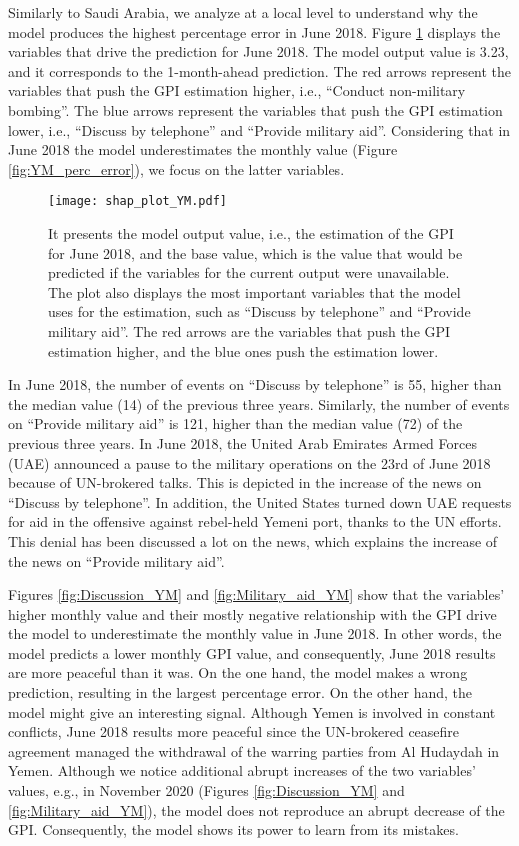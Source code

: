 \documentclass{bmcart}
\begin{document}
Similarly to Saudi Arabia, we analyze at a local level to understand why the model produces the highest percentage error in June 2018. 
Figure \ref{fig:individual_plot_YM} displays the variables that drive the prediction for June 2018. 
The model output value is 3.23, and it corresponds to the 1-month-ahead prediction. 
The red arrows represent the variables that push the GPI estimation higher, i.e., ``Conduct non-military bombing''. 
The blue arrows represent the variables that push the GPI estimation lower, i.e., ``Discuss by telephone'' and ``Provide military aid''. Considering that in June 2018 the model underestimates the monthly value (Figure \ref{fig:YM_perc_error}), we focus on the latter variables. 
\begin{figure}[h!]
\centering
\texttt{[image: shap\_plot\_YM.pdf]}
  \caption{
      It presents the model output value, i.e., the estimation of the GPI for June 2018, and the base value, which is the value that would be predicted if the variables for the current output were unavailable. The plot also displays the most important variables that the model uses for the estimation, such as ``Discuss by telephone'' and ``Provide military aid''. The red arrows are the variables that push the GPI estimation higher, and the blue ones push the estimation lower.}
\label{fig:individual_plot_YM}
\end{figure}

In June 2018, the number of events on ``Discuss by telephone'' is 55, higher than the median value (14) of the previous three years. 
Similarly, the number of events on ``Provide military aid'' is 121, higher than the median value (72) of the previous three years. 
In June 2018, the United Arab Emirates Armed Forces (UAE) announced a pause to the military operations on the 23rd of June 2018 because of UN-brokered talks. This is depicted in the increase of the news on ``Discuss by telephone''. 
In addition, the United States turned down UAE requests for aid in the offensive against rebel-held Yemeni port, thanks to the UN efforts. This denial has been discussed a lot on the news, which explains the increase of the news on ``Provide military aid''. 


Figures \ref{fig:Discussion_YM} and \ref{fig:Military_aid_YM} show that the variables' higher monthly value and their mostly negative relationship with the GPI drive the model to underestimate the monthly value in June 2018. 
In other words, the model predicts a lower monthly GPI value, and consequently, June 2018 results are more peaceful than it was. 
On the one hand, the model makes a wrong prediction, resulting in the largest percentage error. 
On the other hand, the model might give an interesting signal. Although Yemen is involved in constant conflicts, June 2018 results more peaceful since the UN-brokered ceasefire agreement managed the withdrawal of the warring parties from Al Hudaydah in Yemen. 
Although we notice additional abrupt increases of the two variables' values, e.g., in November 2020 (Figures \ref{fig:Discussion_YM} and \ref{fig:Military_aid_YM}), the model does not reproduce an abrupt decrease of the GPI. Consequently, the model shows its power to learn from its mistakes. 
\end{document}
